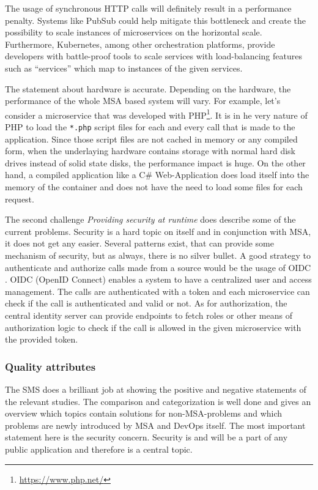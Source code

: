 The usage of synchronous HTTP calls will definitely result
in a performance penalty. Systems like PubSub could help
mitigate this bottleneck and create the possibility to scale
instances of microservices on the horizontal scale.
Furthermore, Kubernetes, among other orchestration platforms, provide developers with
battle-proof tools to scale services with load-balancing features
such as ``services'' which map to instances of the given services.

The statement about hardware is accurate. Depending on the hardware,
the performance of the whole MSA based system will vary. For example,
let's consider a microservice that was developed with
PHP\footnote{\url{https://www.php.net/}}. It is in he very nature of PHP
to load the \texttt{*.php} script files for each and every call that
is made to the application. Since those script files are not cached
in memory or any compiled form, when the underlaying hardware contains
storage with normal hard disk drives instead of solid state disks,
the performance impact is huge. On the other hand, a compiled application
like a C\# Web-Application does load itself into the memory of the
container and does not have the need to load some files for each request.

The second challenge \textit{Providing security at runtime} does
describe some of the current problems. Security is a hard topic
on itself and in conjunction with MSA, it does not get any easier.
Several patterns exist, that can provide some mechanism of security,
but as always, there is no silver bullet. A good strategy to
authenticate and authorize calls made from a source would be the usage
of OIDC \cite{Siriwardena:OIDC}. OIDC (OpenID Connect) enables
a system to have a centralized user and access management. The
calls are authenticated with a token and each microservice can check
if the call is authenticated and valid or not. As for authorization,
the central identity server can provide endpoints to fetch roles
or other means of authorization logic to check if the call is allowed
in the given microservice with the provided token.

\subsubsection{Quality attributes}

The SMS does a brilliant job at showing the positive and negative
statements of the relevant studies. The comparison and categorization
is well done and gives an overview which topics contain solutions
for non-MSA-problems and which problems are newly introduced by
MSA and DevOps itself. The most important statement here is the security
concern. Security is and will be a part of any public application
and therefore is a central topic.

